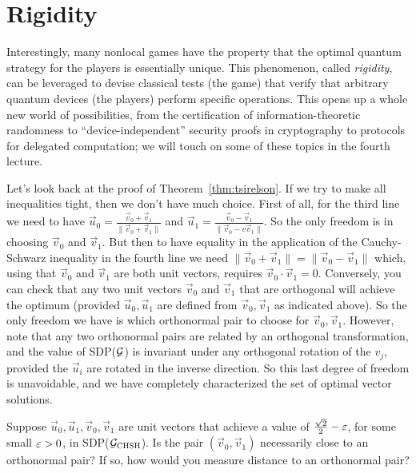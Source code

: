 \chapter{Rigidity}



Interestingly, many nonlocal games have the property that the optimal quantum strategy for the players is essentially unique. This phenomenon, called \emph{rigidity}, can be leveraged to devise classical tests (the game) that verify that arbitrary quantum devices (the players) perform specific operations. This opens up a whole new world of possibilities, from the certification of information-theoretic randomness to ``device-independent'' security proofs in cryptography to protocols for delegated computation; we will touch on some of these topics in the fourth lecture. 




Let's look back at the proof of Theorem~\ref{thm:tsirelson}. If we try to make all inequalities tight, then we don't have much choice. First of all, for the third line we need to have $\vec{u}_0 = \frac{\vec{v}_0+\vec{v}_1}{\|\vec{v}_0+\vec{v}_1\|}$ and $\vec{u}_1 = \frac{\vec{v}_0-\vec{v}_1}{\|\vec{v}_0-v\vec{v}_1\|}$. So the only freedom is in choosing $\vec{v}_0$ and $\vec{v}_1$. But then to have equality in the application of the Cauchy-Schwarz inequality in the fourth line we need $\|\vec{v}_0+\vec{v}_1\|=\|\vec{v}_0-\vec{v}_1\|$ which, using that $\vec{v}_0$ and $\vec{v}_1$ are both unit vectors, requires $\vec{v}_0 \cdot \vec{v}_1 = 0$. Conversely, you can check that any two unit vectors $\vec{v}_0$ and $\vec{v}_1$ that are orthogonal will achieve the optimum (provided $\vec{u}_0,\vec{u}_1$ are defined from $\vec{v}_0,\vec{v}_1$ as indicated above). So the only freedom we have is which orthonormal pair to choose for $\vec{v}_0,\vec{v}_1$. However, note that any two orthonormal pairs are related by an orthogonal transformation, and the value of SDP($\mathcal{G}$) is invariant under any orthogonal rotation of the $v_j$, provided the $\vec{u}_i$ are rotated in the inverse direction. So this last degree of freedom is unavoidable, and we have completely characterized the set of optimal vector solutions. 

\begin{exercise}
Suppose $\vec{u}_0,\vec{u}_1,\vec{v}_0,\vec{v}_1$ are unit vectors that achieve a value of $\frac{\sqrt{2}}{2}-\varepsilon$, for some small $\varepsilon>0$, in SDP($\mathcal{G}_{\textsc{CHSH}}$). Is the pair $(\vec{v}_0,\vec{v}_1)$ necessarily close to an orthonormal pair? If so, how would you measure distance to an orthonormal pair?  
\end{exercise}

